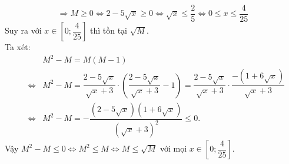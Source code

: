 \begin{bt}
{\begin{enumerate}
			$$ \Rightarrow M \ge 0 \Leftrightarrow 2 - 5\sqrt x  \ge 0 \Leftrightarrow \sqrt x  \le \dfrac{2}{5} \Leftrightarrow 0 \le x \le \dfrac{4}{25}$$
			Suy ra với $x \in \left[ 0;\dfrac{4}{25} \right]$ thì tồn tại $\sqrt M $.\\
			Ta xét:
			\begin{eqnarray*}
				& & M^2 - M = M\left( M - 1 \right) \\
				& \Leftrightarrow & M^2 - M = \dfrac{2 - 5\sqrt x }{\sqrt x  + 3} \cdot \left( \dfrac{2 - 5\sqrt x }{\sqrt x  + 3} - 1 \right) = \dfrac{2 - 5\sqrt x }{\sqrt x  + 3} \cdot \dfrac{ - \left( 1 + 6\sqrt x  \right)}{\sqrt x  + 3} \\
				& \Leftrightarrow & M^2 - M =  - \dfrac{\left( 2 - 5\sqrt x  \right)\left( 1 + 6\sqrt x  \right)}{\left( \sqrt x  + 3 \right)^2} \le 0.
			\end{eqnarray*}
			Vậy $M^2 - M \le 0 \Leftrightarrow M^2 \le M \Leftrightarrow M \le \sqrt M $ với mọi $x \in \left[ 0;\dfrac{4}{25} \right]$.
		\end{enumerate}		
	}
\end{bt}

